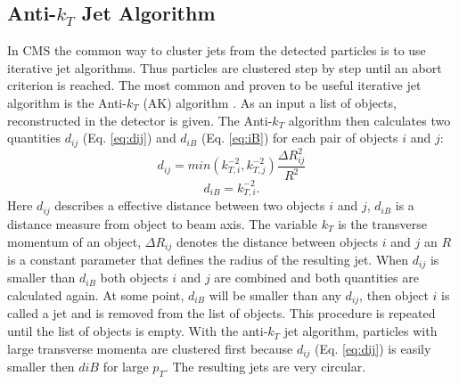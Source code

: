 \subsection{Anti-$k_T$ Jet Algorithm}
	In CMS the common way to cluster jets from the detected particles is to use iterative jet algorithms. Thus particles are clustered step by step until an abort criterion is reached. The most common and proven to be useful iterative jet algorithm is the Anti-$k_T$ (AK) algorithm \cite{antikt}. As an input a list of objects, reconstructed in the detector is given. The Anti-$k_T$ algorithm then calculates two quantities $d_{ij}$ (Eq. \ref{eq:dij}) and $d_{iB}$ (Eq. \ref{eq:iB}) for each pair of objects $i$ and $j$:
	\begin{equation}
	d_{ij} = min (k_{T,i}^{-2}, k_{T,j}^{-2})  \frac{\Delta R_{ij}^2}{R^2}
	\label{eq:dij}
	\end{equation}
	\begin{equation}
	d_{iB} = k_{T,i}^{-2}.
	\label{eq:iB}
	\end{equation}
	Here $d_{ij}$ describes a effective distance between two objects $i$ and $j$, $d_{iB}$ is a distance measure from object to beam axis. The variable $k_T$ is the transverse momentum of an object, $\Delta R_{ij}$ denotes the distance between objects $i$ and $j$ an $R$ is a constant parameter that defines the radius of the resulting jet. When $d_{ij}$ is smaller than $d_{iB}$ both objects $i$ and $j$ are combined and both quantities are calculated again. At some point, $d_{iB}$ will be smaller than any $d_{ij}$, then object $i$ is called a jet and is removed from the list of objects. This procedure is repeated until the list of objects is empty. With the anti-$k_T$ jet algorithm, particles with large transverse momenta are clustered first because $d_{ij}$ (Eq. \ref{eq:dij}) is easily smaller then $d{iB}$ for large $p_T$. The resulting jets are very circular. 

